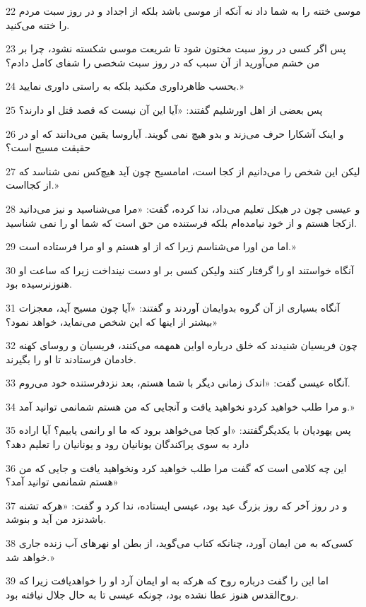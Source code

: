 \par 22 موسی ختنه را به شما داد نه آنکه از موسی باشد بلکه از اجداد و در روز سبت مردم را ختنه می‌کنید.
\par 23 پس اگر کسی در روز سبت مختون شود تا شریعت موسی شکسته نشود، چرا بر من خشم می‌آورید از آن سبب که در روز سبت شخصی را شفای کامل دادم؟
\par 24 بحسب ظاهرداوری مکنید بلکه به راستی داوری نمایید.»
\par 25 پس بعضی از اهل اورشلیم گفتند: «آیا این آن نیست که قصد قتل او دارند؟
\par 26 و اینک آشکارا حرف می‌زند و بدو هیچ نمی گویند. آیاروسا یقین می‌دانند که او در حقیقت مسیح است؟
\par 27 لیکن این شخص را می‌دانیم از کجا است، امامسیح چون آید هیچ‌کس نمی شناسد که از کجااست.»
\par 28 و عیسی چون در هیکل تعلیم می‌داد، ندا کرده، گفت: «مرا می‌شناسید و نیز می‌دانید ازکجا هستم و از خود نیامده‌ام بلکه فرستنده من حق است که شما او را نمی شناسید.
\par 29 اما من اورا می‌شناسم زیرا که از او هستم و او مرا فرستاده است.»
\par 30 آنگاه خواستند او را گرفتار کنند ولیکن کسی بر او دست نینداخت زیرا که ساعت او هنوزنرسیده بود.
\par 31 آنگاه بسیاری از آن گروه بدوایمان آوردند و گفتند: «آیا چون مسیح آید، معجزات بیشتر از اینها که این شخص می‌نماید، خواهد نمود؟»
\par 32 چون فریسیان شنیدند که خلق درباره اواین همهمه می‌کنند، فریسیان و روسای کهنه خادمان فرستادند تا او را بگیرند.
\par 33 آنگاه عیسی گفت: «اندک زمانی دیگر با شما هستم، بعد نزدفرستنده خود می‌روم.
\par 34 و مرا طلب خواهید کردو نخواهید یافت و آنجایی که من هستم شمانمی توانید آمد.»
\par 35 پس یهودیان با یکدیگرگفتند: «او کجا می‌خواهد برود که ما او رانمی یابیم؟ آیا اراده دارد به سوی پراکندگان یونانیان رود و یونانیان را تعلیم دهد؟
\par 36 این چه کلامی است که گفت مرا طلب خواهید کرد ونخواهید یافت و جایی که من هستم شمانمی توانید آمد؟»
\par 37 و در روز آخر که روز بزرگ عید بود، عیسی ایستاده، ندا کرد و گفت: «هر‌که تشنه باشدنزد من آید و بنوشد.
\par 38 کسی‌که به من ایمان آورد، چنانکه کتاب می‌گوید، از بطن او نهرهای آب زنده جاری خواهد شد.»
\par 39 اما این را گفت درباره روح که هر‌که به او ایمان آرد او را خواهدیافت زیرا که روح‌القدس هنوز عطا نشده بود، چونکه عیسی تا به حال جلال نیافته بود.
